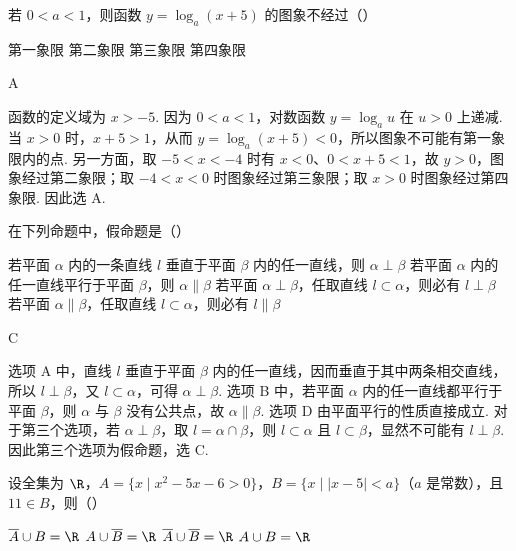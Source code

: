 \begin{problem}
若 \(0 < a < 1 \)，则函数 \(y = \log_{a}(x + 5) \) 的图象不经过（\quad）

\choices
    {第一象限}
    {第二象限}
    {第三象限}
    {第四象限}
\end{problem}

\begin{answer}
A
\end{answer}

\begin{solution}
函数的定义域为 \(x>-5\). 因为 \(0<a<1\)，对数函数 \(y=\log_a u\) 在 \(u>0\) 上递减. 当 \(x>0\) 时，\(x+5>1\)，从而 \(y=\log_a(x+5)<0\)，所以图象不可能有第一象限内的点. 另一方面，取 \(-5<x<-4\) 时有 \(x<0\)、\(0<x+5<1\)，故 \(y>0\)，图象经过第二象限；取 \(-4<x<0\) 时图象经过第三象限；取 \(x>0\) 时图象经过第四象限. 因此选 A.
\end{solution}

\begin{problem}
在下列命题中，假命题是（\quad）

\choices
    {若平面 \(\alpha \) 内的一条直线 \(l\) 垂直于平面 \(\beta \) 内的任一直线，则 \(\alpha \perp \beta \)}
    {若平面 \(\alpha \) 内的任一直线平行于平面 \(\beta \)，则 \(\alpha \parallel \beta \)}
    {若平面 \(\alpha \perp \beta \)，任取直线 \(l \subset \alpha \)，则必有 \(l \perp \beta \)}
    {若平面 \(\alpha \parallel \beta\)，任取直线 \(l \subset \alpha\)，则必有 \(l \parallel \beta\)}
\end{problem}

\begin{answer}
C
\end{answer}

\begin{solution}
选项 A 中，直线 \(l\) 垂直于平面 \(\beta\) 内的任一直线，因而垂直于其中两条相交直线，所以 \(l\perp\beta\)，又 \(l\subset\alpha\)，可得 \(\alpha\perp\beta\). 选项 B 中，若平面 \(\alpha\) 内的任一直线都平行于平面 \(\beta\)，则 \(\alpha\) 与 \(\beta\) 没有公共点，故 \(\alpha\parallel\beta\). 选项 D 由平面平行的性质直接成立. 对于第三个选项，若 \(\alpha\perp\beta\)，取 \(l=\alpha\cap\beta\)，则 \(l\subset\alpha\) 且 \(l\subset\beta\)，显然不可能有 \(l\perp\beta\). 因此第三个选项为假命题，选 C.
\end{solution}

\begin{problem}
设全集为 \(\R\)，\(A = \{x \mid x^2 - 5x - 6 > 0\}\)，\(B = \{x \mid |x - 5| < a\}\)（\(a\) 是常数），且 \(11 \in B\)，则（\quad）

\choices
    {\(\overline{A} \cup B = \R\)}
    {\(A \cup \overline{B} = \R\)}
    {\(\overline{A}\cup\overline{B} = \R\)}
    {\(A \cup B = \R\)}
\end{problem}

